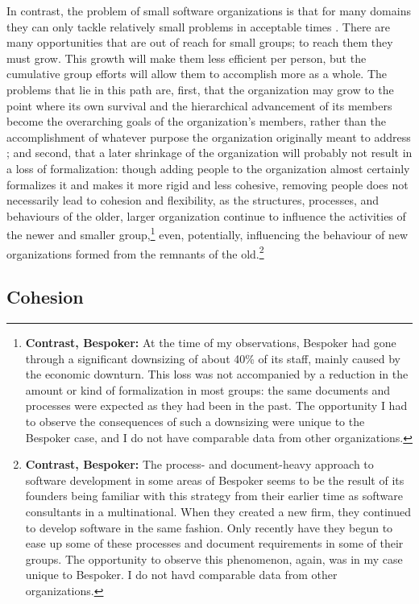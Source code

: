 In contrast, the problem of small software organizations is that for many domains they can only tackle relatively small problems in acceptable times \cite{Brooks1975}. There are many opportunities that are out of reach for small groups; to reach them they must grow. This growth will make them less efficient per person, but the cumulative group efforts will allow them to accomplish more as a whole. The problems that lie in this path are, first, that the organization may grow to the point where its own survival and the hierarchical advancement of its members become the overarching goals of the organization's members, rather than the accomplishment of whatever purpose the organization originally meant to address \cite{Blau1971}; and second, that a later shrinkage of the organization will probably not result in a loss of formalization: though adding people to the organization almost certainly formalizes it and makes it more rigid and less cohesive, removing people does not necessarily lead to cohesion and flexibility, as the structures, processes, and behaviours of the older, larger organization continue to influence the activities of the newer and smaller group,\footnote{\textbf{Contrast, Bespoker:} At the time of my observations, Bespoker had gone through a significant downsizing of about 40\% of its staff, mainly caused by the economic downturn. This loss was not accompanied by a reduction in the amount or kind of formalization in most groups: the same documents and processes were expected as they had been in the past. The opportunity I had to observe the consequences of such a downsizing were unique to the Bespoker case, and I do not have comparable data from other organizations.} even, potentially, influencing the behaviour of new organizations formed from the remnants of the old.\footnote{\textbf{Contrast, Bespoker:} The process- and document-heavy approach to software development in some areas of Bespoker seems to be the result of its founders being familiar with this strategy from their earlier time as software consultants in a multinational. When they created a new firm, they continued to develop software in the same fashion. Only recently have they begun to ease up some of these processes and document requirements in some of their groups. The opportunity to observe this phenomenon, again, was in my case unique to Bespoker. I do not havd comparable data from other organizations.}



\subsection{Cohesion}

